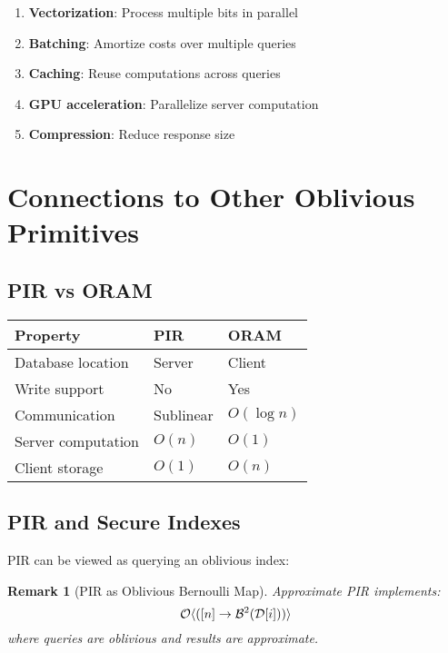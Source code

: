 \documentclass[11pt,final]{article}
\newcommand{\DB}{\mathcal{D}}
\newtheorem{remark}[theorem]{Remark}
\begin{document}
\begin{enumerate}
    \item \textbf{Vectorization}: Process multiple bits in parallel
    \item \textbf{Batching}: Amortize costs over multiple queries
    \item \textbf{Caching}: Reuse computations across queries
    \item \textbf{GPU acceleration}: Parallelize server computation
    \item \textbf{Compression}: Reduce response size
\end{enumerate}

\section{Connections to Other Oblivious Primitives}

\subsection{PIR vs ORAM}

\begin{center}
\begin{tabular}{lll}
\toprule
\textbf{Property} & \textbf{PIR} & \textbf{ORAM} \\
\midrule
Database location & Server & Client \\
Write support & No & Yes \\
Communication & Sublinear & $O(\log n)$ \\
Server computation & $O(n)$ & $O(1)$ \\
Client storage & $O(1)$ & $O(n)$ \\
\bottomrule
\end{tabular}
\end{center}

\subsection{PIR and Secure Indexes}

PIR can be viewed as querying an oblivious index:

\begin{remark}[PIR as Oblivious Bernoulli Map]
Approximate PIR implements:
\begin{equation}
\ObvMap{[n]}{\Bernoulli{\DB[i]}{2}}
\end{equation}
where queries are oblivious and results are approximate.
\end{remark}
\end{document}
